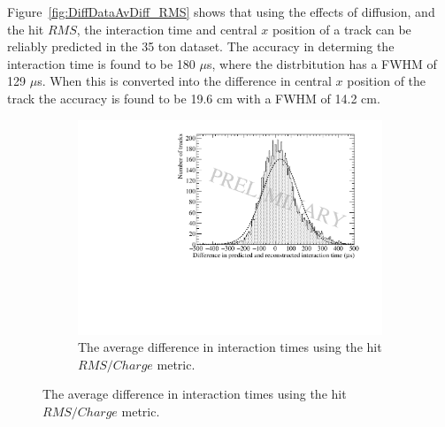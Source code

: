 Figure~\ref{fig:DiffDataAvDiff_RMS} shows that using the effects of diffusion, and the hit $RMS$, the interaction time and central $x$ position of a track can be reliably predicted in the 35 ton dataset. The accuracy in determing the interaction time is found to be 180 $\mu$s, where the distrbitution has a FWHM of 129 $\mu$s. When this is converted into the difference in central $x$ position of the track the accuracy is found to be 19.6 cm with a FWHM of 14.2 cm. \\

\begin{figure}[h!]
  \centering
  \begin{subfigure}{0.6\textwidth}
    \centering
    \includegraphics[width=\textwidth]{Data_AvTimeDiff_RMS_Int}
    \caption{The average difference in interaction times using the hit $RMS/Charge$ metric.}
    \label{fig:DiffDataAvDiff_RMS_Int_T}
  \end{subfigure}


\end{figure}
